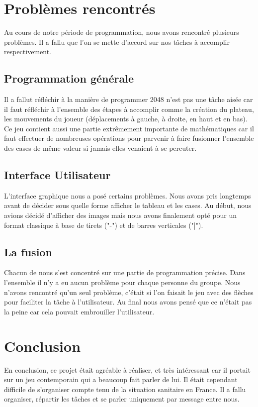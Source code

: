 \documentclass[13pt]{report}
\begin{document}
\clearpage

\section{Problèmes rencontrés}
\large
Au cours de notre période de programmation, nous avons rencontré plusieurs problèmes. Il a fallu que l'on se mette d'accord sur nos tâches à accomplir respectivement.

\subsection{Programmation générale}
Il a fallut réfléchir à la manière de programmer 2048 n'est pas une tâche aisée car il faut réfléchir à l'ensemble des étapes à accomplir comme la création du plateau, les mouvements du joueur (déplacements à gauche, à droite, en haut et en bas). Ce jeu contient aussi une partie extrêmement importante de mathématiques car il faut effectuer de nombreuses opérations pour parvenir à faire fusionner l'ensemble des cases de même valeur si jamais elles venaient à se percuter.

\subsection{Interface Utilisateur}
L'interface graphique nous a posé certains problèmes. Nous avons pris longtemps avant de décider sous quelle forme afficher le tableau et les cases. Au début, nous avions décidé d'afficher des images mais nous avons finalement opté pour un format classique à base de tirets ("-") et de barres verticales ("|").

\subsection{La fusion}
Chacun de nous s'est concentré sur une partie de programmation précise. Dans l'ensemble il n'y a eu aucun problème pour chaque personne du groupe. Nous n'avons rencontré qu'un seul problème, c'était si l'on faisait le jeu avec des flèches pour faciliter la tâche à l'utilisateur. Au final nous avons pensé que ce n'était pas la peine car cela pouvait embrouiller l'utilisateur.

\clearpage


\section{Conclusion}
En conclusion, ce projet était agréable à réaliser, et très intéressant car il portait sur un jeu contemporain qui a beaucoup fait parler de lui. Il était cependant difficile de s'organiser compte tenu de la situation sanitaire en France. 
Il a fallu organiser, répartir les tâches et se parler uniquement par message entre nous.
 
\end{document}
